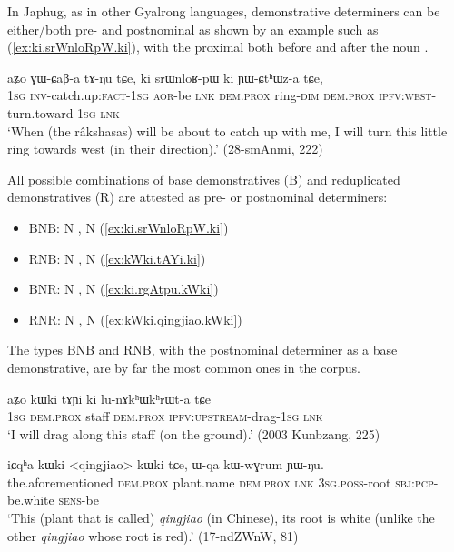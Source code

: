 In Japhug, as in other Gyalrong languages, demonstrative determiners can be either/both pre- and postnominal as shown by an example such as (\ref{ex:ki.srWnloRpW.ki}), with the proximal  both before and after the noun .

\begin{exe}
\ex \label{ex:ki.srWnloRpW.ki}
 \gll aʑo ɣɯ-ɕaβ-a tɤ-ŋu tɕe, ki srɯnloʁ-pɯ ki ɲɯ-ɕtʰɯz-a tɕe,  \\
 \textsc{1sg} \textsc{inv}-catch.up:\textsc{fact}-\textsc{1sg} \textsc{aor}-be \textsc{lnk} \textsc{dem}.\textsc{prox} ring-\textsc{dim} \textsc{dem}.\textsc{prox} \textsc{ipfv}:\textsc{west}-turn.toward-\textsc{1sg} \textsc{lnk} \\
\glt `When (the râkshasas) will be about to catch up with me, I will  turn this little ring towards west (in their direction).' (28-smAnmi, 222)
\end{exe}

All possible combinations of base demonstratives (B) and reduplicated demonstratives (R) are attested as pre- or postnominal determiners:

\begin{itemize}
\item BNB:  N ,  N  (\ref{ex:ki.srWnloRpW.ki})
\item RNB:  N ,  N  (\ref{ex:kWki.tAYi.ki})
\item BNR:  N ,  N  (\ref{ex:ki.rgAtpu.kWki})
\item RNR:  N ,  N  (\ref{ex:kWki.qingjiao.kWki})
\end{itemize}  

The types BNB and RNB, with the postnominal determiner as a base demonstrative, are by far the most common ones in the corpus.

\begin{exe}
\ex \label{ex:kWki.tAYi.ki}
 \gll  aʑo kɯki tɤɲi ki lu-nɤkʰɯkʰrɯt-a tɕe \\
 \textsc{1sg} \textsc{dem}.\textsc{prox} staff \textsc{dem}.\textsc{prox} \textsc{ipfv}:\textsc{upstream}-drag-\textsc{1sg} \textsc{lnk} \\
 \glt `I will drag along this staff (on the ground).' (2003 Kunbzang, 225)
\end{exe}
 

\begin{exe}
\ex \label{ex:kWki.qingjiao.kWki}
 \gll iɕqʰa kɯki <qingjiao> kɯki tɕe, ɯ-qa kɯ-wɣrum ɲɯ-ŋu. \\
 the.aforementioned \textsc{dem}.\textsc{prox} plant.name \textsc{dem}.\textsc{prox} \textsc{lnk} \textsc{3sg}.\textsc{poss}-root \textsc{sbj}:\textsc{pcp}-be.white \textsc{sens}-be \\
 \glt `This (plant that is called) \textit{qingjiao} (in Chinese), its root is white (unlike the other \textit{qingjiao} whose root is red).' (17-ndZWnW, 81)
\end{exe}

